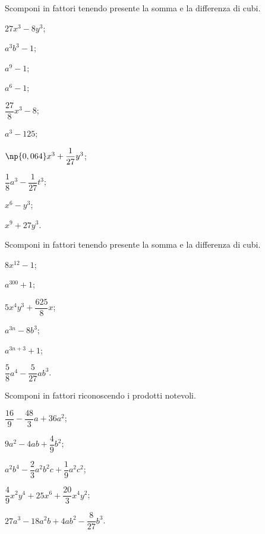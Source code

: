 \begin{esercizio}
\label{ese:13.73}
 Scomponi in fattori tenendo presente la somma e la differenza di cubi.
 \begin{multicols}{3}
 \begin{enumeratea}
  \item $27x^{3}-8y^{3}$;
 \item $a^{3}b^{3}-1$;
 \item $a^{9}-1$;
 \item $a^{6}-1$;
 \item $\dfrac{27}{8}x^{3}-8$;
 \item $a^{3}-125$;
 \item $\np{0,064}x^{3}+\dfrac{1}{27}y^{3}$;
 \item $\dfrac{1}{8}a^{3}-\dfrac{1}{27}t^{3}$;
 \item $x^{6}-y^{3}$;
 \item $x^{9}+27y^{3}$.
 \end{enumeratea}
 \end{multicols}
\end{esercizio}

\begin{esercizio}
\label{ese:13.74}
 Scomponi in fattori tenendo presente la somma e la differenza di cubi.
 \begin{multicols}{3}
 \begin{enumeratea}
 \item $8x^{12}-1$;
 \item $a^{300}+1$;
\item $5x^{4}y^{3}+\dfrac{625}{8}x$;
 \item $a^{3n}-8b^{3}$;
 \item $a^{3n+3}+1$;
 \item $\dfrac{5}{8}a^{4}-\dfrac{5}{27}ab^{3}$.
 \end{enumeratea}
 \end{multicols}
\end{esercizio}

\begin{esercizio}[\Ast]
\label{ese:13.75}
Scomponi in fattori riconoscendo i prodotti notevoli.
\begin{enumeratea}
 \item $\dfrac{16}{9}-\dfrac{48}{3}a+36a^{2}$;
 \item $9a^{2}-4ab+\dfrac{4}{9}b^{2}$;
 \item $a^{2}b^{4}-\dfrac{2}{3}a^{2}b^{2}c+\dfrac{1}{9}a^{2}c^{2}$;
 \item $\dfrac{4}{9}x^{2}y^{4}+25x^{6}+\dfrac{20}{3}x^{4}y^{2}$;
 \item $27a^{3}-18a^{2}b+4ab^{2}-\dfrac{8}{27}b^{3}$.
\end{enumeratea}
\end{esercizio}

